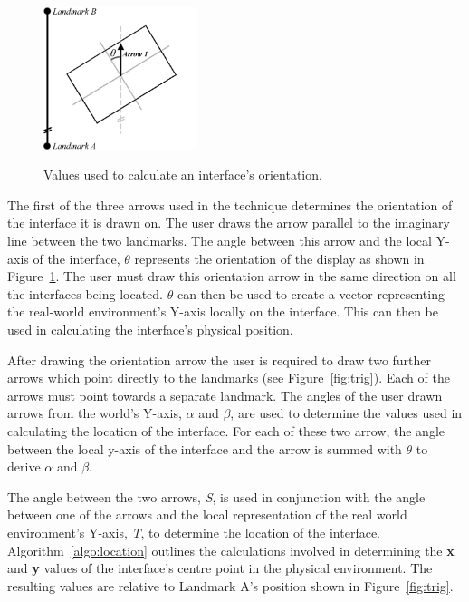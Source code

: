 \documentclass{bmcart}
\begin{document}
\begin{figure}[h]
   \centering
   \caption{Values used to calculate an interface's orientation.}
   \includegraphics[width=0.4\textwidth]{figures/orientation_maths.png}
   \label{fig:orienTrig}
\end{figure}

The first of the three arrows used in the technique determines the orientation of the interface it is drawn on.
The user draws the arrow parallel to the imaginary line between the two landmarks.
The angle between this arrow and the local Y-axis of the interface, $\theta$ represents the orientation of the display as shown in Figure~\ref{fig:orienTrig}.
The user must draw this orientation arrow in the same direction on all the interfaces being located.
\textbf{$\theta$} can then be used to create a vector representing the real-world environment's Y-axis locally on the interface.
This can then be used in calculating the interface's physical position.

After drawing the orientation arrow the user is required to draw two further arrows which point directly to the landmarks (see Figure~\ref{fig:trig}).
Each of the arrows must point towards a separate landmark.
The angles of the user drawn arrows from the world's Y-axis, $\alpha$ and $\beta$, are used to determine the values used in calculating the location of the interface.
For each of these two arrow, the angle between the local y-axis of the interface and the arrow is summed with $\theta$ to derive $\alpha$ and $\beta$.

The angle between the two arrows, {\emph{S}}, is used in conjunction with the angle between one of the arrows and the local representation of the real world environment's Y-axis, {\emph{T}}, to determine the location of the interface.
Algorithm~\ref{algo:location} outlines the calculations involved in determining the \textbf{x} and \textbf{y} values of the interface's centre point in the physical environment.
The resulting values are relative to Landmark A's position shown in Figure~\ref{fig:trig}.
\end{document}
